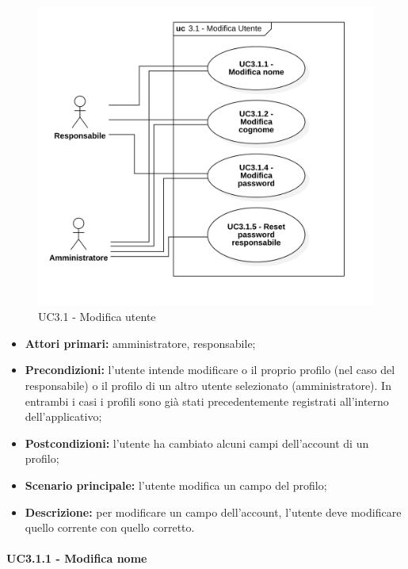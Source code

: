 \begin{figure}[H]
	\centering
	\includegraphics[scale=0.52]{res/images/uc3-1.png}
	\caption{UC3.1 - Modifica utente}
\end{figure}
\begin{itemize}
	\item 	\textbf{Attori primari:} amministratore, responsabile;
	\item 	\textbf{Precondizioni:} l'utente intende modificare o il proprio profilo (nel caso del responsabile) o il profilo di un altro utente selezionato (amministratore). In entrambi i casi i profili sono già stati precedentemente registrati all'interno dell'applicativo;
	\item 	\textbf{Postcondizioni:} l'utente ha cambiato alcuni campi dell'account di un profilo;
	\item 	\textbf{Scenario principale:} l'utente modifica un campo del profilo;
	\item 	\textbf{Descrizione:} per modificare un campo dell'account, l'utente deve modificare quello corrente con quello corretto.

\end{itemize}

\paragraph{UC3.1.1 - Modifica nome}

